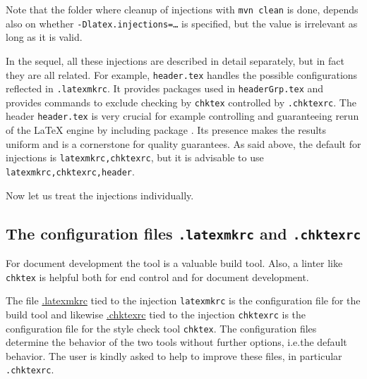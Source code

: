 Note that the folder where cleanup of injections with \texttt{mvn clean} is done, 
depends also on whether \texttt{-Dlatex.injections=\dots} is specified, 
but the value is irrelevant as long as it is valid. 

In the sequel, all these injections are described in detail separately, 
but in fact they are all related. 
For example, \texttt{header.tex} handles the possible configurations 
reflected in \texttt{.latexmkrc}. 
It provides packages used in \texttt{headerGrp.tex} 
and provides commands to exclude checking by \texttt{chktex} 
controlled by \texttt{.chktexrc}. 
The header \texttt{header.tex} is very crucial 
for example controlling and guaranteeing rerun of the \LaTeX{} engine 
by including package . 
Its presence makes the results uniform and is a cornerstone for quality guarantees. 
As said above, the default for injections is \texttt{latexmkrc,chktexrc}, 
but it is advisable to use \texttt{latexmkrc,chktexrc,header}. 





Now let us treat the injections individually. 



\subsection{The configuration files \texttt{.latexmkrc} and \texttt{.chktexrc}}\label{subsec:latChkRc}

For document development the tool  is a valuable build tool. 
Also, a linter like \texttt{chktex} is helpful 
both for end control and for document development. 

The file \href{\urlSite fromTex/.latexmkrc}{.latexmkrc} 
tied to the injection \texttt{latexmkrc} 
is the configuration file for the build tool  
and likewise \href{\urlSite fromTex/.chktexrc}{.chktexrc} 
tied to the injection \texttt{chktexrc} 
is the configuration file for the style check tool \texttt{chktex}. 
The configuration files determine the behavior of the two tools without further options, 
i.e.\@ the default behavior. 
The user is kindly asked to help to improve these files, in particular \texttt{.chktexrc}. 

